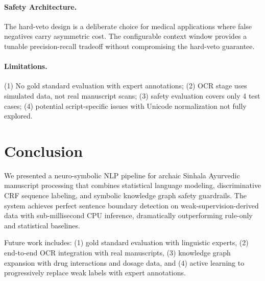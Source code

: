 \documentclass[11pt,a4paper]{article}
\begin{document}
\paragraph{Safety Architecture.} The hard-veto design is a deliberate choice for medical applications where false negatives carry asymmetric cost. The configurable context window provides a tunable precision-recall tradeoff without compromising the hard-veto guarantee.

\paragraph{Limitations.} (1) No gold standard evaluation with expert annotations; (2) OCR stage uses simulated data, not real manuscript scans; (3) safety evaluation covers only 4 test cases; (4) potential script-specific issues with Unicode normalization not fully explored.

\section{Conclusion}

We presented a neuro-symbolic NLP pipeline for archaic Sinhala Ayurvedic manuscript processing that combines statistical language modeling, discriminative CRF sequence labeling, and symbolic knowledge graph safety guardrails. The system achieves perfect sentence boundary detection on weak-supervision-derived data with sub-millisecond CPU inference, dramatically outperforming rule-only and statistical baselines.

Future work includes: (1) gold standard evaluation with linguistic experts, (2) end-to-end OCR integration with real manuscripts, (3) knowledge graph expansion with drug interactions and dosage data, and (4) active learning to progressively replace weak labels with expert annotations.



\end{document}
